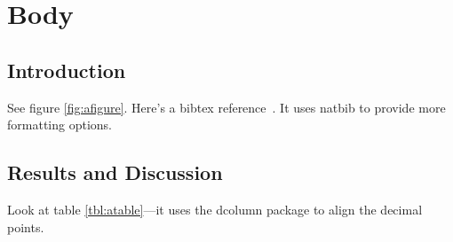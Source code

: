 \chapter{Body}
\section{\label{sec:intro}Introduction}
\par See figure \ref{fig:afigure}. Here's a bibtex reference~\citep{hohenberg:B864}. It uses natbib to provide more formatting options.

\par\lipsum
\section{\label{sec:results}Results and Discussion}
Look at table \ref{tbl:atable}---it uses the dcolumn package to align the decimal points.

\par\lipsum
